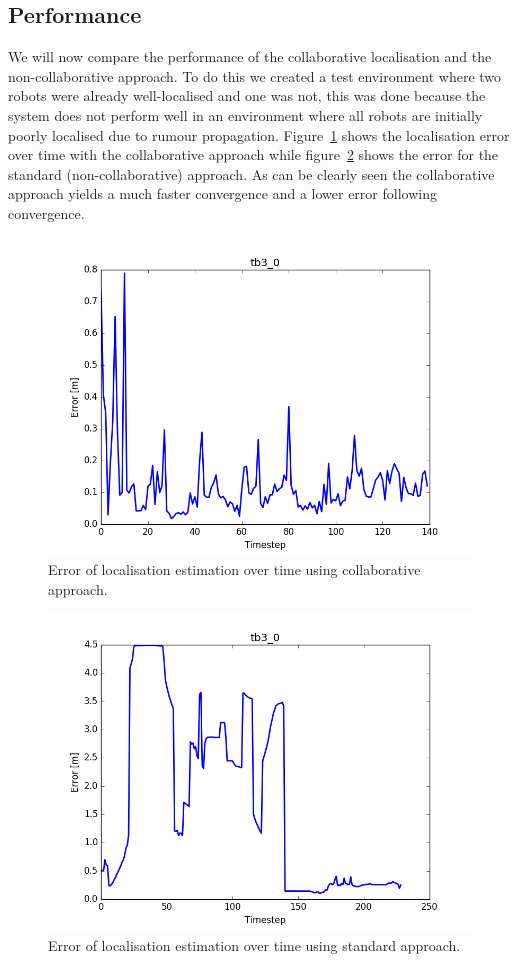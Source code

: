 \documentclass[a4paper, 10pt, conference]{ieeeconf}      %
\begin{document}
\subsection{Performance}
We will now compare the performance of the collaborative localisation and the non-collaborative approach. To do this we created a test environment where two robots were already well-localised and one was not, this was done because the system does not perform well in an environment where all robots are initially poorly localised due to rumour propagation. Figure~\ref{fig:loca1} shows the localisation error over time with the collaborative approach while figure~\ref{fig:loca2} shows the error for the standard (non-collaborative) approach. As can be clearly seen the collaborative approach yields a much faster convergence and a lower error following convergence.
\begin{figure}
	\centering
	\includegraphics[width=\columnwidth]{figure_l1.png}
	\caption{Error of localisation estimation over time using collaborative approach.}
	\label{fig:loca1}
\end{figure}
\begin{figure}
	\includegraphics[width=\columnwidth]{figure_l2.png}
	\caption{Error of localisation estimation over time using standard approach.}
	\label{fig:loca2}
\end{figure}
\end{document}
